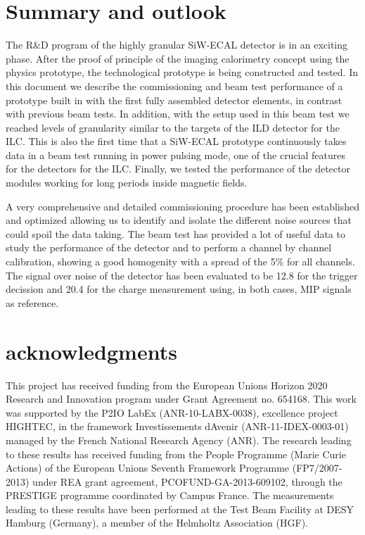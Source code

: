 \documentclass[final,3p,times,twocolumn]{elsarticle}
\begin{document}
\section{Summary and outlook}
\label{sec:summary}

The R\&D program of the highly granular SiW-ECAL detector is in an exciting phase. 
After the proof of principle of the imaging calorimetry concept using the physics prototype, the 
technological prototype is being constructed and tested. In this document we describe the commissioning and
beam test performance of a prototype built in with the first fully assembled
detector elements, in contrast with previous beam tests. In addition,
with the setup used in this beam test we reached levels of granularity
similar to the targets of the ILD detector for the ILC. This is also the first time
that a SiW-ECAL prototype continuously takes data in a beam test running in power pulsing mode, one of the crucial
features for the detectors for the ILC. Finally, we tested the performance of the detector
modules working for long periods inside magnetic fields.

A very comprehensive and detailed commissioning procedure has been established and optimized
allowing us to identify and isolate the different noise sources that could spoil the data taking.
The beam test has provided a lot of useful data to study 
the performance of the detector and to perform
a channel by channel calibration, showing a good homogenity with a spread of the 5\% for all channels.
The signal over noise of the detector has been evaluated to be 12.8 for the trigger
decission and 20.4 for the charge measurement using, in both cases, MIP signals as reference.


\section*{acknowledgments}

This project has received funding from the European Union{\textquotesingle}s Horizon 2020 Research and Innovation program under Grant Agreement no. 654168.
This work was supported by the P2IO LabEx (ANR-10-LABX-0038), excellence project HIGHTEC,
in the framework {\textquotesingle}Investissements d{\textquotesingle}Avenir{\textquotesingle}
(ANR-11-IDEX-0003-01) managed by the French National Research Agency (ANR).
The research leading to these results has received funding from the People Programme (Marie
Curie Actions) of the European Union{\textquotesingle}s Seventh Framework Programme (FP7/2007-2013)
under REA grant agreement, PCOFUND-GA-2013-609102, through the PRESTIGE
programme coordinated by Campus France.
The measurements leading to these results have been performed at the Test Beam Facility at DESY Hamburg (Germany), a member of the Helmholtz Association (HGF).


%


\end{document}
